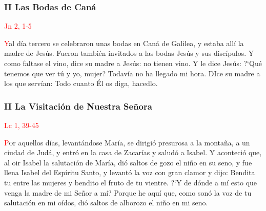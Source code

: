 \documentclass[10pt,twoside]{book}
\begin{document}
\begin{paracol}{2}
      \begin{leftcolumn}
            \noindent\subsubsection*{II Las Bodas de Caná}
            
            \vspace{-0.5em}

            \hfill\textcolor{red}{Jn 2, 1-5}

            \lettrine[lines=2]{\textcolor{red}{Y}}\space al día tercero se celebraron unas bodas en Caná de Galilea, y estaba allí la madre de Jesús. Fueron también invitados a las bodas
            Jesús y sus discípulos. Y como faltase el vino, dice su madre a Jesús: no tienen vino. Y le dice Jesús: {?`}Qué tenemos que ver tú y yo, mujer? Todavía no ha llegado mi hora.
            DIce su madre a los que servían: Todo cuanto Él os diga, hacedlo.
      \end{leftcolumn}
      \begin{rightcolumn}
            \noindent\subsubsection*{II La Visitación de Nuestra Señora}

            \vspace{-0.5em}

            \hfill\textcolor{red}{Lc 1, 39-45}

            \lettrine[lines=2]{\textcolor{red}{P}}or aquellos días, levantándose María, se dirigió presurosa a la montaña, a un ciudad de Judá, 
            y entró en la casa de Zacarías y saludó a Isabel. Y aconteció que, al oir Isabel la salutación de María, dió saltos de 
            gozo el niño en su seno, y fue llena Isabel del Espíritu Santo, y levantó la voz con gran clamor y dijo: Bendita tu entre 
            las mujeres y bendito el fruto de tu vientre. {?`}Y de dónde a mí esto que venga la madre de mi Señor a mí? Porque he aquí que, 
            como sonó la voz de tu salutación en mi oídos, dió saltos de alborozo el niño en mi seno.
      \end{rightcolumn}
\end{paracol}


\end{document}
